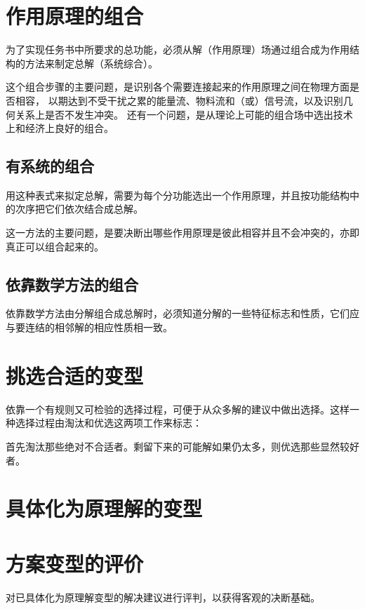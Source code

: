 \documentclass[letterpaper,10pt,english]{sphinxmanual}
\begin{document}
\section{作用原理的组合}
\label{unit5:id17}
为了实现任务书中所要求的总功能，必须从解（作用原理）场通过组合成为作用结构的方法来制定总解（系统综合）。

这个组合步骤的主要问题，是识别各个需要连接起来的作用原理之间在物理方面是否相容，
以期达到不受干扰之累的能量流、物料流和（或）信号流，以及识别几何关系上是否不发生冲突。
还有一个问题，是从理论上可能的组合场中选出技术上和经济上良好的组合。


\subsection{有系统的组合}
\label{unit5:id18}
用这种表式来拟定总解，需要为每个分功能选出一个作用原理，并且按功能结构中的次序把它们依次结合成总解。

这一方法的主要问题，是要决断出哪些作用原理是彼此相容并且不会冲突的，亦即真正可以组合起来的。


\subsection{依靠数学方法的组合}
\label{unit5:id19}
依靠数学方法由分解组合成总解时，必须知道分解的一些特征标志和性质，它们应与要连结的相邻解的相应性质相一致。


\section{挑选合适的变型}
\label{unit5:id20}
依靠一个有规则又可检验的选择过程，可便于从众多解的建议中做出选择。这样一种选择过程由淘汰和优选这两项工作来标志：

首先淘汰那些绝对不合适者。剩留下来的可能解如果仍太多，则优选那些显然较好者。


\section{具体化为原理解的变型}
\label{unit5:id21}

\section{方案变型的评价}
\label{unit5:id22}
对已具体化为原理解变型的解决建议进行评判，以获得客观的决断基础。
\end{document}
